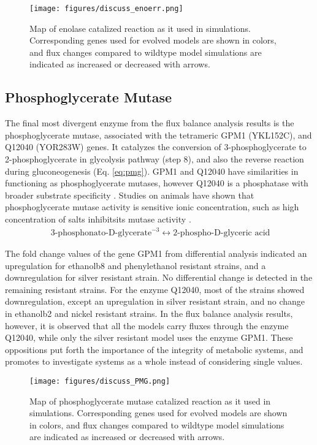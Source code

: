 \begin{figure}[H]
\texttt{[image: figures/discuss\_enoerr.png]}
\caption[Map of enolase catalized reaction as it used in simulations]{Map of enolase catalized reaction as it used in simulations. Corresponding genes used for evolved models are shown in colors, and flux changes compared to wildtype model simulations are indicated as increased or decreased with arrows.}
\label{fig:discuss_ENOERR}
\end{figure}


\subsection{Phosphoglycerate Mutase}
The final most divergent enzyme from the flux balance analysis results is the phosphoglycerate mutase, associated with the tetrameric GPM1 (YKL152C), and Q12040 (YOR283W) genes. It catalyzes the conversion of 3-phosphoglycerate to 2-phosphoglycerate in glycolysis pathway (step 8), and also the reverse reaction during gluconeogenesis (Eq. \ref{eq:pmg}). GPM1 and Q12040 have similarities in functioning as phosphoglycerate mutases, however Q12040 is a phosphatase with broader substrate specificity \cite{ho2009identification}. Studies on animals have shown that phosphoglycerate mutase activity is sensitive ionic concentration, such as high concentration of salts inhibitsits mutase activity \cite{grisolia1967mercury}.
\begin{align}
  \label{eq:pmg}
  \ \text{3-phosphonato-D-glycerate}^{-3} \leftrightarrow \text{2-phospho-D-glyceric acid}
\end{align}

The fold change values of the gene GPM1 from differential analysis indicated an upregulation for ethanolb8 and phenylethanol resistant strains, and a downregulation for silver resistant strain. No differential change is detected in the remaining resistant strains. For the enzyme Q12040, most of the strains showed downregulation, except an upregulation in silver resistant strain, and no change in ethanolb2 and nickel resistant strains. In the flux balance analysis results, however, it is observed that all the models carry fluxes through the enzyme Q12040, while only the silver resistant model uses the enzyme GPM1. These oppositions put forth the importance of the integrity of metabolic systems, and promotes to investigate systems as a whole instead of considering single values.
\begin{figure}[H]
\texttt{[image: figures/discuss\_PMG.png]}
\caption[Map of phosphoglycerate mutase catalized reaction as it used in simulations]{Map of phosphoglycerate mutase catalized reaction as it used in simulations. Corresponding genes used for evolved models are shown in colors, and flux changes compared to wildtype model simulations are indicated as increased or decreased with arrows.}
\label{fig:discuss_PMG}
\end{figure}


